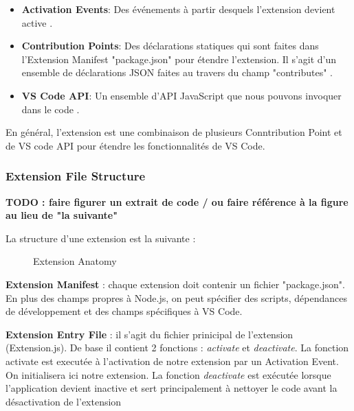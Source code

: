 \documentclass[
    iict, %
    il, %
]{heig-tb}
\begin{document}
\begin{itemize}
    \item \textbf{Activation Events}: Des événements à partir desquels l'extension devient active \cite{activation-events}.
    \item \textbf{Contribution Points}: Des déclarations statiques qui sont faites dans l'Extension Manifest "package.json" pour étendre l'extension. Il s'agit d'un ensemble de déclarations JSON faites au travers du champ "contributes" \cite{contribution-points}.
    \item \textbf{VS Code API}: Un ensemble d'API JavaScript que nous pouvons invoquer dans le code \cite{vs-code-api}.
\end{itemize}

En général, l'extension est une combinaison de plusieurs Conntribution Point et de VS code API pour étendre les fonctionnalités de VS Code.

\subsubsection{Extension File Structure}\label{Extension File Structure}

\textbf{TODO : faire figurer un extrait de code / ou faire référence à la figure au lieu de "la suivante" }

La structure d'une extension est la suivante :

\begin{figure}[!h]
    \begin{center}
    \end{center}
    \caption[Extension Anatomy]{\label{extension-anatomy} Extension Anatomy}
\end{figure}

\textbf{Extension Manifest} :
chaque extension doit contenir un fichier "package.json". En plus des champs propres à Node.js, on peut spécifier des scripts, dépendances de développement et des champs spécifiques à VS Code.

\textbf{Extension Entry File} :
il s'agit du fichier prinicipal de l'extension (Extension.js).
De base il contient 2 fonctions : \emph{activate} et \emph{deactivate}.
La fonction activate est executée à l'activation de notre extension par un Activation Event. On initialisera ici notre extension.
La fonction \emph{deactivate} est exécutée lorsque l'application devient inactive et sert principalement à nettoyer le code avant la désactivation de l'extension
\end{document}
